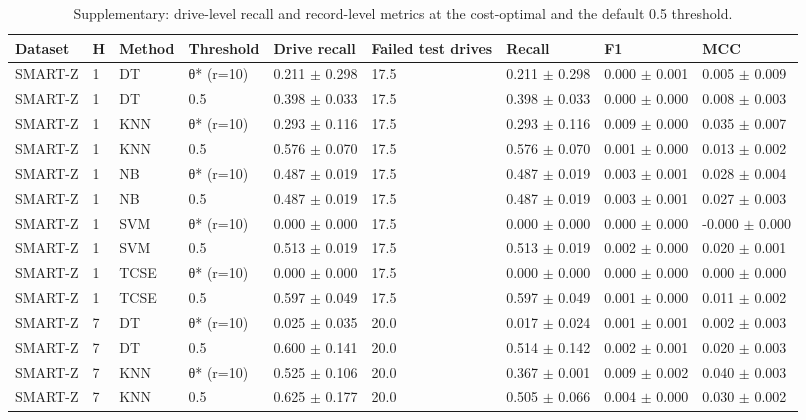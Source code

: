 \begin{table}[t]
\centering
\caption{Supplementary: drive-level recall and record-level metrics at the cost-optimal and the default 0.5 threshold.}
\label{tab:table1b_drive_level_and_default_threshold}
\footnotesize
\begin{tabular}{lllllllll}
\toprule
Dataset & H & Method & Threshold & Drive recall & Failed test drives & Recall & F1 & MCC \\
\midrule
SMART-Z & 1 & DT & θ* (r=10) & 0.211 $\pm$ 0.298 & 17.5 & 0.211 $\pm$ 0.298 & 0.000 $\pm$ 0.001 & 0.005 $\pm$ 0.009 \\
SMART-Z & 1 & DT & 0.5 & 0.398 $\pm$ 0.033 & 17.5 & 0.398 $\pm$ 0.033 & 0.000 $\pm$ 0.000 & 0.008 $\pm$ 0.003 \\
SMART-Z & 1 & KNN & θ* (r=10) & 0.293 $\pm$ 0.116 & 17.5 & 0.293 $\pm$ 0.116 & 0.009 $\pm$ 0.000 & 0.035 $\pm$ 0.007 \\
SMART-Z & 1 & KNN & 0.5 & 0.576 $\pm$ 0.070 & 17.5 & 0.576 $\pm$ 0.070 & 0.001 $\pm$ 0.000 & 0.013 $\pm$ 0.002 \\
SMART-Z & 1 & NB & θ* (r=10) & 0.487 $\pm$ 0.019 & 17.5 & 0.487 $\pm$ 0.019 & 0.003 $\pm$ 0.001 & 0.028 $\pm$ 0.004 \\
SMART-Z & 1 & NB & 0.5 & 0.487 $\pm$ 0.019 & 17.5 & 0.487 $\pm$ 0.019 & 0.003 $\pm$ 0.001 & 0.027 $\pm$ 0.003 \\
SMART-Z & 1 & SVM & θ* (r=10) & 0.000 $\pm$ 0.000 & 17.5 & 0.000 $\pm$ 0.000 & 0.000 $\pm$ 0.000 & -0.000 $\pm$ 0.000 \\
SMART-Z & 1 & SVM & 0.5 & 0.513 $\pm$ 0.019 & 17.5 & 0.513 $\pm$ 0.019 & 0.002 $\pm$ 0.000 & 0.020 $\pm$ 0.001 \\
SMART-Z & 1 & TCSE & θ* (r=10) & 0.000 $\pm$ 0.000 & 17.5 & 0.000 $\pm$ 0.000 & 0.000 $\pm$ 0.000 & 0.000 $\pm$ 0.000 \\
SMART-Z & 1 & TCSE & 0.5 & 0.597 $\pm$ 0.049 & 17.5 & 0.597 $\pm$ 0.049 & 0.001 $\pm$ 0.000 & 0.011 $\pm$ 0.002 \\
SMART-Z & 7 & DT & θ* (r=10) & 0.025 $\pm$ 0.035 & 20.0 & 0.017 $\pm$ 0.024 & 0.001 $\pm$ 0.001 & 0.002 $\pm$ 0.003 \\
SMART-Z & 7 & DT & 0.5 & 0.600 $\pm$ 0.141 & 20.0 & 0.514 $\pm$ 0.142 & 0.002 $\pm$ 0.001 & 0.020 $\pm$ 0.003 \\
SMART-Z & 7 & KNN & θ* (r=10) & 0.525 $\pm$ 0.106 & 20.0 & 0.367 $\pm$ 0.001 & 0.009 $\pm$ 0.002 & 0.040 $\pm$ 0.003 \\
SMART-Z & 7 & KNN & 0.5 & 0.625 $\pm$ 0.177 & 20.0 & 0.505 $\pm$ 0.066 & 0.004 $\pm$ 0.000 & 0.030 $\pm$ 0.002 \\

\end{tabular}
\end{table}
